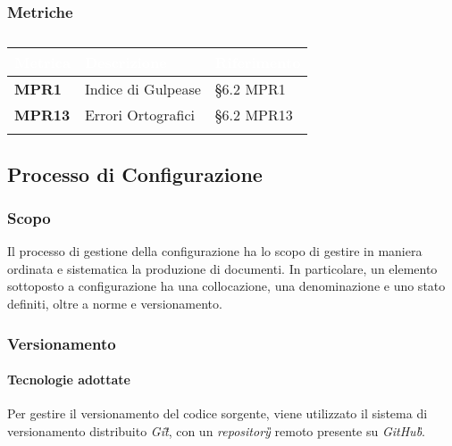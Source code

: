 			\subsubsection{Metriche}
			\setlength{\freewidth}{\dimexpr\textwidth-0\tabcolsep}
			\renewcommand{\arraystretch}{1.5}
			\setlength{\aboverulesep}{0pt}
			\setlength{\belowrulesep}{0pt}
			\begin{longtable}{L{.22\freewidth} L{.4\freewidth} L{.2\freewidth}}
				\toprule
				\textcolor{white}{\textbf{Metrica}}&
				\textcolor{white}{\textbf{Descrizione}}&	
				\textcolor{white}{\textbf{Riferimento}}\\
				\toprule
				\endhead
				
				\textbf{MPR1} & Indice di Gulpease & \S 6.2 MPR1 \\
				\textbf{MPR13} & Errori Ortografici & \S 6.2 MPR13 \\

				\bottomrule
				\caption{}
			\end{longtable}
			
	\subsection{Processo di Configurazione}
	\subsubsection{Scopo}
		Il processo di gestione della configurazione ha lo scopo di gestire in maniera ordinata e sistematica la produzione di documenti. %
		 In particolare, un elemento sottoposto a configurazione ha una collocazione, una denominazione e uno stato definiti, oltre a norme e versionamento. 
 	
	\subsubsection{Versionamento}
		\paragraph*{Tecnologie adottate}
		\aCapo{}  
			Per gestire il versionamento del codice sorgente, viene utilizzato il sistema di versionamento distribuito \emph{Git\G}, con un \emph{repository\G{}} remoto presente su \emph{GitHub\G}.
			
